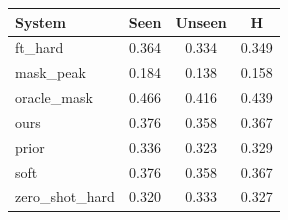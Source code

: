 \begin{tabular}{lccc}
\toprule
System & Seen & Unseen & H \\
\midrule
ft\_hard & 0.364 & 0.334 & 0.349 \\
mask\_peak & 0.184 & 0.138 & 0.158 \\
oracle\_mask & 0.466 & 0.416 & 0.439 \\
ours & 0.376 & 0.358 & 0.367 \\
prior & 0.336 & 0.323 & 0.329 \\
soft & 0.376 & 0.358 & 0.367 \\
zero\_shot\_hard & 0.320 & 0.333 & 0.327 \\
\bottomrule
\end{tabular}
